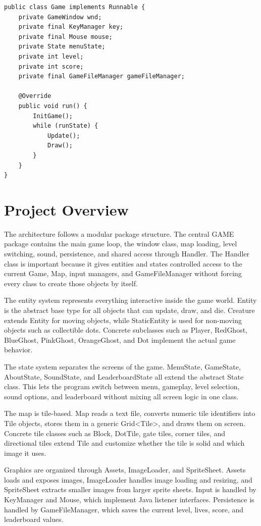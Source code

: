 \documentclass[12pt,a4paper]{article}
\begin{document}
\begin{lstlisting}
public class Game implements Runnable {
    private GameWindow wnd;
    private final KeyManager key;
    private final Mouse mouse;
    private State menuState;
    private int level;
    private int score;
    private final GameFileManager gameFileManager;

    @Override
    public void run() {
        InitGame();
        while (runState) {
            Update();
            Draw();
        }
    }
}
\end{lstlisting}


\section*{Project Overview}
The architecture follows a modular package structure. The central GAME package contains the main game loop, the window class, map loading, level switching, sound, persistence, and shared access through Handler. The Handler class is important because it gives entities and states controlled access to the current Game, Map, input managers, and GameFileManager without forcing every class to create those objects by itself.

The entity system represents everything interactive inside the game world. Entity is the abstract base type for all objects that can update, draw, and die. Creature extends Entity for moving objects, while StaticEntity is used for non-moving objects such as collectible dots. Concrete subclasses such as Player, RedGhost, BlueGhost, PinkGhost, OrangeGhost, and Dot implement the actual game behavior.

The state system separates the screens of the game. MenuState, GameState, AboutState, SoundState, and LeaderboardState all extend the abstract State class. This lets the program switch between menu, gameplay, level selection, sound options, and leaderboard without mixing all screen logic in one class.

The map is tile-based. Map reads a text file, converts numeric tile identifiers into Tile objects, stores them in a generic Grid<Tile>, and draws them on screen. Concrete tile classes such as Block, DotTile, gate tiles, corner tiles, and directional tiles extend Tile and customize whether the tile is solid and which image it uses.

Graphics are organized through Assets, ImageLoader, and SpriteSheet. Assets loads and exposes images, ImageLoader handles image loading and resizing, and SpriteSheet extracts smaller images from larger sprite sheets. Input is handled by KeyManager and Mouse, which implement Java listener interfaces. Persistence is handled by GameFileManager, which saves the current level, lives, score, and leaderboard values.
\end{document}
